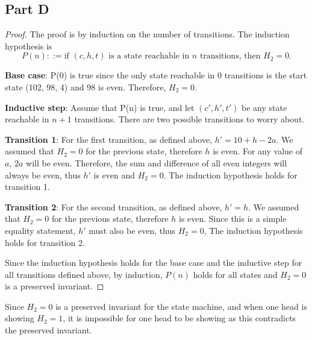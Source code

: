 \documentclass{article}
\begin{document}
\subsection*{Part D}

\begin{proof}
  The proof is by induction on the number of transitions. The induction
  hypothesis is
  $$ P(n) ::= \textrm{if } (c, h, t) \textrm{ is a state reachable in } n
  \textrm{ transitions, then } H_{2} = 0. $$

  \noindent
  \textbf{Base case}: P(0) is true since the only state reachable in 0
  transitions is the start state (102, 98, 4) and 98 is even. Therefore, $H_{2}
  = 0$.

  \bigbreak

  \noindent
  \textbf{Inductive step}: Assume that P(n) is true, and let $(c',h',t')$ be any
  state reachable in $n + 1$ transitions. There are two possible transitions to
  worry about.

  \bigbreak

  \textbf{Transition 1}: For the first transition, as defined above, $h' = 10 +
  h - 2a$. We assumed that $H_{2} = 0$ for the previous state, therefore $h$ is
  even. For any value of $a$, $2a$ will be even. Therefore, the sum and
  difference of all even integers will always be even, thus $h'$ is even and
  $H_{2} = 0$. The induction hypothesis holds for transition 1.

  \bigbreak

  \textbf{Transition 2}: For the second transition, as defined above, $h' = h$.
  We assumed that $H_{2} = 0$ for the previous state, therefore $h$ is even.
  Since this is a simple equality statement, $h'$ must also be even, thus $H_{2}
  = 0$, The induction hypothesis holds for transition 2.

  \bigbreak

  Since the induction hypothesis holds for the base case and the inductive step
  for all transitions defined above, by induction, $P(n)$ holds for all states
  and $H_{2} = 0$ is a preserved invariant.
\end{proof}

Since $H_{2} = 0$ is a preserved invariant for the state machine, and when one
head is showing $H_{2} = 1$, it is impossible for one head to be showing as this
contradicts the preserved invariant.

\bigbreak
\bigbreak
\bigbreak
\bigbreak
\bigbreak
\bigbreak
\bigbreak
\bigbreak
\bigbreak
\bigbreak
\bigbreak
\bigbreak
\bigbreak
\end{document}
